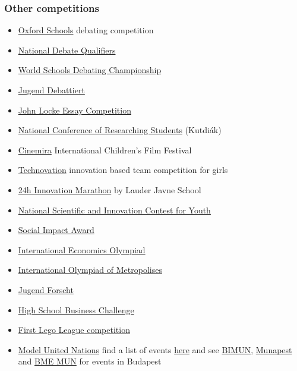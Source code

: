 \documentclass{article}
\begin{document}
\subsubsection{Other competitions}

\begin{itemize}
    \item \href{https://www.oxfordschools.net/}{Oxford Schools} debating competition
    \item \href{https://milestone-institute.org/student-life/debate/}{National Debate Qualifiers}
    \item \href{https://wsdcdebate.org/about-wsdc}{World Schools Debating Championship}
    \item \href{https://www.jugend-debattiert.eu/}{Jugend Debattiert}
    \item \href{https://www.johnlockeinstitute.com/essay-competition}{John Locke Essay Competition}
    \item \href{https://www.kutdiak.hu/en/events/}{National Conference of Researching Students} (Kutdiák)
    \item \href{https://www.kidfilmfestival.hu/en/}{Cinemira} International Children's Film Festival
    \item \href{https://technovationchallenge.org/}{Technovation} innovation based team competition for girls
    \item \href{https://lim.lauder.hu/}{24h Innovation Marathon} by Lauder Javne School
    \item \href{https://www.innovacio.hu/en_3a.htm}{National Scientific and Innovation Contest for Youth}
    \item \href{https://hungary.socialimpactaward.net/en/}{Social Impact Award}
    \item \href{https://ecolymp.org/}{International Economics Olympiad}
    \item \href{http://megapolis.educom.ru/en}{International Olympiad of Metropolises}
    \item \href{https://www.jugend-forscht.de/}{Jugend Forscht}
    \item \href{https://businessismore.eu/}{High School Business Challenge}
    \item \href{https://www.firstlegoleague.org/}{First Lego League competition}
    \item \href{https://en.wikipedia.org/wiki/Model_United_Nations}{Model United Nations} find a list of events \href{https://mymun.com/}{here} and see \href{https://www.bimun.hu/}{BIMUN}, \href{http://munapest.com/}{Munapest} and \href{https://www.mun.bme.hu/}{BME MUN} for events in Budapest

\end{itemize}
\end{document}
